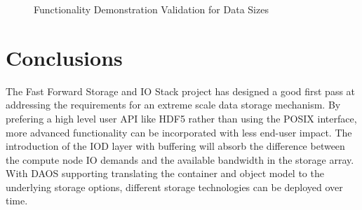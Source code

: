 \documentclass[conference]{IEEEtran}
\begin{document}
\begin{figure}[htbp!]
\centering
\vspace{-0.10in}
\vspace{-0.10in}
\caption{Functionality Demonstration Validation for Data Sizes}
\label{fig:eval-size}
\vspace{-0.05in}
\end{figure}

\section{Conclusions}
\label{sec:conclusion}

The Fast Forward Storage and IO Stack project has designed a good first pass at
addressing the requirements for an extreme scale data storage mechanism.  By
prefering a high level user API like HDF5 rather than using the POSIX
interface, more advanced functionality can be incorporated with less end-user
impact. The introduction of the IOD layer with buffering will absorb the
difference between the compute node IO demands and the available bandwidth in
the storage array. With DAOS supporting translating the container and object
model to the underlying storage options, different storage technologies can be
deployed over time.
\end{document}
